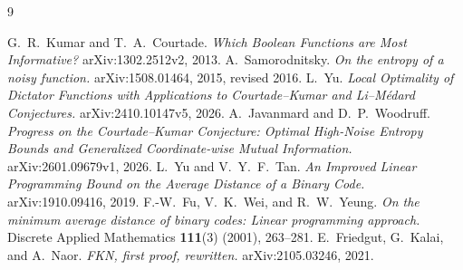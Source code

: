 \begingroup
\small

\begin{thebibliography}{9}
\raggedright
\setlength{\itemsep}{2pt}
\setlength{\parskip}{0pt}
 G.~R.~Kumar and T.~A.~Courtade.
\emph{Which Boolean Functions are Most Informative?}
\mbox{arXiv:1302.2512v2}, 2013.
 A.~Samorodnitsky.
\emph{On the entropy of a noisy function.}
arXiv:1508.01464, 2015, revised 2016.
 L.~Yu.
\emph{Local Optimality of Dictator Functions with Applications to Courtade--Kumar and Li--M\'edard Conjectures.}
arXiv:2410.10147v5, 2026.
 A.~Javanmard and D.~P.~Woodruff.
\emph{Progress on the Courtade--Kumar Conjecture: Optimal High-Noise Entropy Bounds and Generalized Coordinate-wise Mutual Information.}
arXiv:2601.09679v1, 2026.
 L.~Yu and V.~Y.~F.~Tan.
\emph{An Improved Linear Programming Bound on the Average Distance of a Binary Code.}
arXiv:1910.09416, 2019.
 F.-W.~Fu, V.~K.~Wei, and R.~W.~Yeung.
\emph{On the minimum average distance of binary codes: Linear programming approach.}
Discrete Applied Mathematics \textbf{111}(3) (2001), 263--281.
 E.~Friedgut, G.~Kalai, and A.~Naor.
\emph{FKN, first proof, rewritten.}
arXiv:2105.03246, 2021.
\end{thebibliography}

\endgroup

